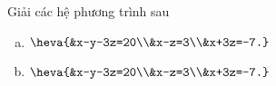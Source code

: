 \begin{bt}
	Giải các hệ phương trình sau
	\begin{enumerate}[a)]
	\item $\heva{&x-y-3z=20\\&x-z=3\\&x+3z=-7.}$
	\item $\heva{&x-y-3z=20\\&x-z=3\\&x+3z=-7.}$
	\end{enumerate}
\end{bt}

